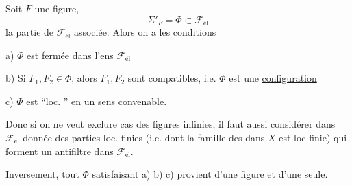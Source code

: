 Soit $F$ une figure, 
\[
\Sigma'_F=\Phi\subset\mathcal{F}_{\text{él}}
\]
la partie de $\mathcal{F}_{\text{él}}$ associée. Alors on a les conditions

a) $\Phi$ est fermée dans l'ens  $\mathcal{F}_{\text{él}}$

b) Si  $F_1,F_2\in\Phi$,  alors $F_1,F_2$ sont compatibles, i.e. $\Phi$ est une \uline{configuration}

c) $\Phi$ est ``loc. '' en un sens convenable.

Donc si on ne veut exclure  cas des figures infinies, il faut aussi considérer dans $\mathcal{F}_{\text{el}}$  donnée des parties loc. finies (i.e. dont la famille des  dans $X$ est loc finie) qui forment un antifiltre dans $\mathcal{F}_{\text{el}}$.

Inversement, tout $\Phi$ satisfaisant a) b) c) provient d'une figure et d'une seule.
